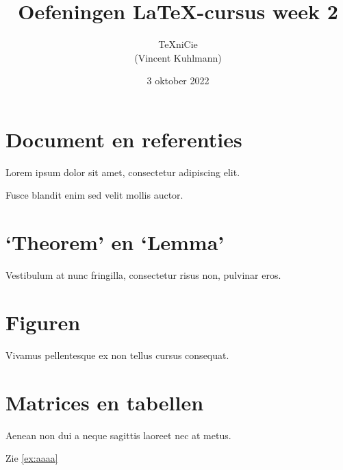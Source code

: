 \documentclass[a4paper]{article}
\title{Oefeningen \LaTeX-cursus week 2}
\author{\TeX niCie\\(Vincent Kuhlmann)}
\date{3 oktober 2022}
\begin{document}
    \maketitle

    \section{Document en referenties}

    \begin{exercise}\label{ex:aaaa}
        Lorem ipsum dolor sit amet, consectetur adipiscing elit.
    \end{exercise}

    \begin{exercise}
        Fusce blandit enim sed velit mollis auctor.
    \end{exercise}

    \section{`Theorem' en `Lemma'}

    \begin{exercise}
        Vestibulum at nunc fringilla, consectetur risus non, pulvinar eros.
    \end{exercise}

    \section{Figuren}

    \begin{exercise}
        Vivamus pellentesque ex non tellus cursus consequat.
    \end{exercise}

    \section{Matrices en tabellen}

    \begin{exercise}
        Aenean non dui a neque sagittis laoreet nec at metus.
    \end{exercise}

    Zie \autoref{ex:aaaa}
\end{document}
